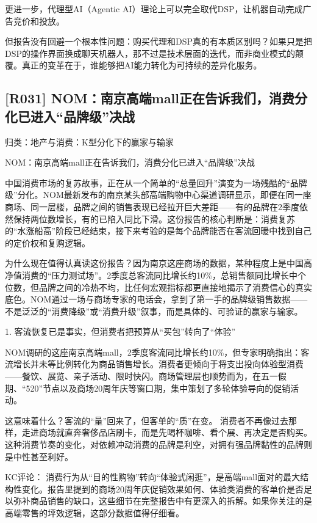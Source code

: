 \documentclass[11pt]{ctexart}
\begin{document}
更进一步，代理型AI（Agentic AI）理论上可以完全取代DSP，让机器自动完成广告竞价和投放。

但报告没有回避一个根本性问题：购买代理和DSP真的有本质区别吗？如果只是把DSP的操作界面换成聊天机器人，那不过是技术层面的迭代，而非商业模式的颠覆。真正的变革在于，谁能够把AI能力转化为可持续的差异化服务。

\subsection{[R031] NOM：南京高端mall正在告诉我们，消费分化已进入“品牌级”决战}
{\small\color{refgray}归类：地产与消费：K型分化下的赢家与输家}

NOM：南京高端mall正在告诉我们，消费分化已进入“品牌级”决战

中国消费市场的复苏故事，正在从一个简单的“总量回升”演变为一场残酷的“品牌级”分化。NOM最新发布的南京某头部高端购物中心渠道调研显示，即便在同一座商场、同一层楼，品牌之间的销售表现已经拉开巨大差距——有的品牌在2季度依然保持两位数增长，有的已陷入同比下滑。这份报告的核心判断是：消费复苏的“水涨船高”阶段已经结束，接下来考验的是每个品牌能否在客流回暖中找到自己的定价权和复购逻辑。

为什么现在值得认真读这份报告？因为南京这座商场的数据，某种程度上是中国高净值消费的“压力测试场”。2季度总客流同比增长约10\%，总销售额同比增长中个位数，但品牌之间的冷热不均，比任何宏观指标都更直接地揭示了消费信心的真实底色。NOM通过一场与商场专家的电话会，拿到了第一手的品牌级销售数据——不是泛泛的“消费降级”或“消费升级”叙事，而是具体的、可验证的赢家与输家。

1. 客流恢复已是事实，但消费者把预算从“买包”转向了“体验”

NOM调研的这座南京高端mall，2季度客流同比增长约10\%，但专家明确指出：客流增长并未等比例转化为商品销售增长。消费者更倾向于将支出投向体验型消费——餐饮、展览、亲子活动、限时快闪。商场管理层也顺势而为，在五一假期、“520”节点以及商场20周年庆等窗口期，集中策划了多轮体验导向的促销活动。

这意味着什么？客流的“量”回来了，但客单的“质”在变。 消费者不再像过去那样，走进商场就直奔奢侈品店刷卡，而是先喝杯咖啡、看个展、再决定是否购买。这种消费节奏的变化，对依赖冲动消费的品牌是利空，对拥有强品牌黏性的品牌则是中性甚至利好。

KC评论： 消费行为从“目的性购物”转向“体验式闲逛”，是高端mall面对的最大结构性变化。报告里提到的商场20周年庆促销效果如何、体验类消费的客单价是否足以弥补商品销售的缺口，这些细节在完整报告中有更深入的拆解。如果你关注的是高端零售的坪效逻辑，这部分数据值得仔细看。
\end{document}
